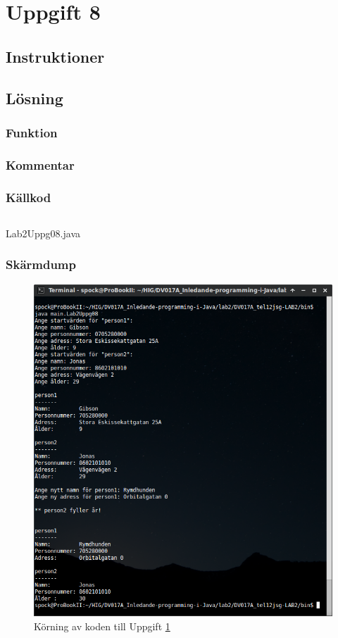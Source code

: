 \section{Uppgift 8}\label{sec:uppg08}

\subsection{Instruktioner}


\subsection{Lösning}
\subsubsection{Funktion}

\subsubsection{Kommentar}


\subsubsection{Källkod}
\inputminted[linenos]{java}{src/Lab2Uppg08.java}
\caption{Lab2Uppg08.java}
\label{src:uppg08}


\subsubsection{Skärmdump}
\begin{figure}[htbp]
    \centering
        \includegraphics[width=\linewidth]{img/08.png}
    \caption{Körning av koden till Uppgift \ref{sec:uppg08}}
    \label{fig:uppg08-screenshot}
\end{figure}

